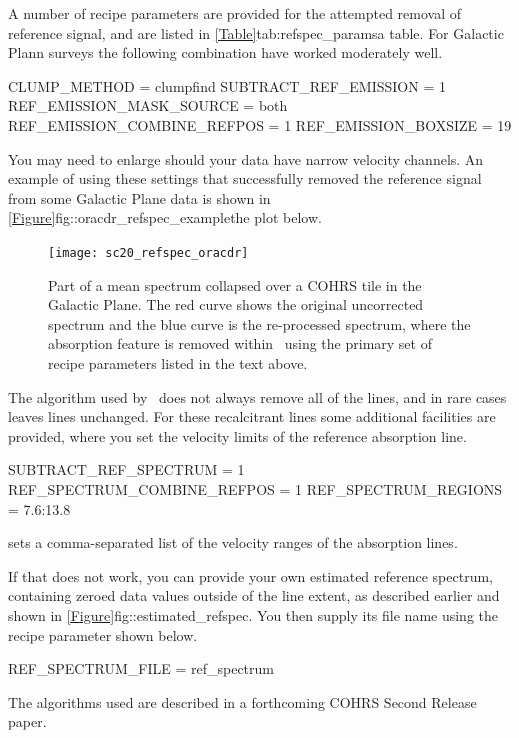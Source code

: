 \documentclass[11pt,oneside,chapters]{starlink}
\begin{document}
A number of recipe parameters are provided for the attempted removal
of reference signal, and are listed in
\cref{Table}{tab:refspec_params}{a table}.
For Galactic Plann surveys the following combination have worked
moderately well.

\begin{terminalv}
CLUMP_METHOD = clumpfind
SUBTRACT_REF_EMISSION = 1
REF_EMISSION_MASK_SOURCE = both
REF_EMISSION_COMBINE_REFPOS = 1
REF_EMISSION_BOXSIZE = 19
\end{terminalv}

You may need to enlarge  should your data
have narrow velocity channels.  An example of using these settings
that successfully removed the reference signal from some Galactic Plane
data is shown in \cref{Figure}{fig::oracdr_refspec_example}{the plot below}.

\begin{figure}[h!]
\begin{center}
\texttt{[image: sc20\_refspec\_oracdr]}
\caption[Examples of reference-signal removal in \oracdr]{\label{fig::oracdr_refspec_example}
  Part of a mean spectrum collapsed over a COHRS\cite{COHRS} tile in the
  Galactic Plane.  The red curve shows the original uncorrected spectrum
  and the blue curve is the re-processed spectrum, where the absorption
  feature is removed within \oracdr\ using the primary set of recipe
  parameters listed in the text above.}
\end{center}
\end{figure}


The algorithm used by \oracdr\ does not always remove all of
the lines, and in rare cases leaves lines unchanged.  For these
recalcitrant lines some additional facilities are provided, where you
set the velocity limits of the reference absorption line.

\begin{terminalv}
SUBTRACT_REF_SPECTRUM = 1
REF_SPECTRUM_COMBINE_REFPOS = 1
REF_SPECTRUM_REGIONS = 7.6:13.8
\end{terminalv}

 sets a comma-separated list of the
velocity ranges of the absorption lines.

If that does not work, you can provide your own estimated reference
spectrum, containing zeroed data values outside of the line extent, as
described earlier and shown in
\cref{Figure}{fig::estimated_refspec}{}.  You then supply its file
name using the recipe parameter shown below.

\begin{terminalv}
REF_SPECTRUM_FILE = ref_spectrum
\end{terminalv}

The algorithms used are described in a forthcoming COHRS \cite{COHRS}
Second Release paper.
\end{document}
